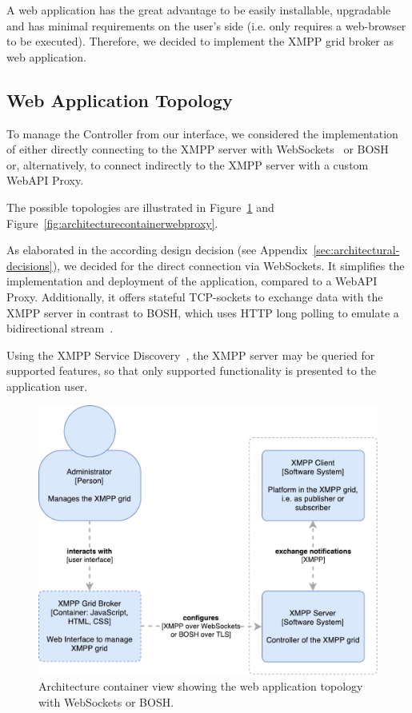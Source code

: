 A web application has the great advantage to be easily installable, upgradable and has minimal requirements on the user's side (i.e. only requires a web-browser to be executed).
Therefore, we decided to implement the XMPP grid broker as web application.


\subsection{Web Application Topology}

To manage the Controller from our interface, we considered the implementation of either directly connecting to the XMPP server with WebSockets~\cite{rfc7395} or BOSH~\cite{xep-0124} or, alternatively, to connect indirectly to the XMPP server with a custom WebAPI Proxy.

The possible topologies are illustrated in Figure~\ref{fig:architecturecontainerwebapplication} and Figure~\ref{fig:architecturecontainerwebproxy}.

As elaborated in the according design decision (see Appendix~\ref{sec:architectural-decisions}), we decided for the direct connection via WebSockets.
It simplifies the implementation and deployment of the application, compared to a WebAPI Proxy.
Additionally, it offers stateful TCP-sockets to exchange data with the XMPP server in contrast to BOSH, which uses HTTP long polling to emulate a bidirectional stream~\cite{xep-0124}.

Using the XMPP Service Discovery~\cite{xep-0030}, the XMPP server may be queried for supported features, so that only supported functionality is presented to the application user.

\begin{figure}[h]
\centering
\includegraphics[width=0.7\linewidth]{resources/architecture_container_webapplication}
\caption[Architecture Container Diagram Web Application]{Architecture container view showing the web application topology with WebSockets or BOSH.}
\label{fig:architecturecontainerwebapplication}
\end{figure}

